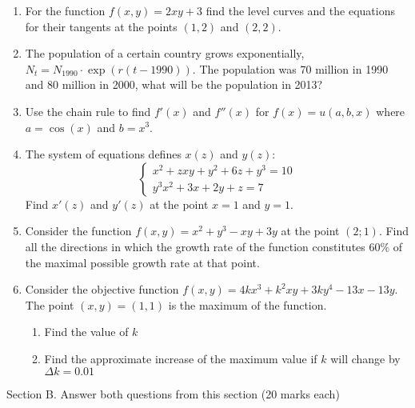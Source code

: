 \begin{enumerate}

\item For the function $f(x,y)=2xy+3$ find the level curves and the equations for their tangents at the points $(1,2)$ and $(2, 2)$.

\item The population of a certain country grows exponentially, $N_t= N_{1990}\cdot \exp (r(t-1990))$. The population was 70 million in 1990 and 80 million in 2000,
what will be the population in 2013?

\item Use the chain rule to find $f'(x)$ and $f''(x)$ for $f(x)=u(a,b,x)$ where $a=\cos(x)$ and $b=x^3$.

\item The system of equations defines $x(z)$ and $y(z)$:
\begin{equation}
\begin{cases}
x^2+zxy+y^2+6z+y^3=10 \\
y^3x^2+3x+2y+z=7 \nonumber
\end{cases}
\end{equation}
Find $x'(z)$ and $y'(z)$ at the point $x=1$ and $y=1$.

\item Consider the function $f(x,y)=x^2+y^3-xy+3y$ at the point $(2;1)$. Find all the directions in which the  growth rate of the function constitutes $60\%$ of the maximal possible growth rate at that point.

\item Consider the objective function $f(x,y)=4kx^3+k^2xy+3ky^4-13x-13y$. The point $(x,y)=(1,1)$ is the maximum of the function.
\begin{enumerate}
\item Find the value of $k$
\item Find the approximate increase of the maximum value if $k$ will change by $\Delta k=0.01$
\end{enumerate}


\end{enumerate}

Section B. Answer both questions from this section (20 marks each)

